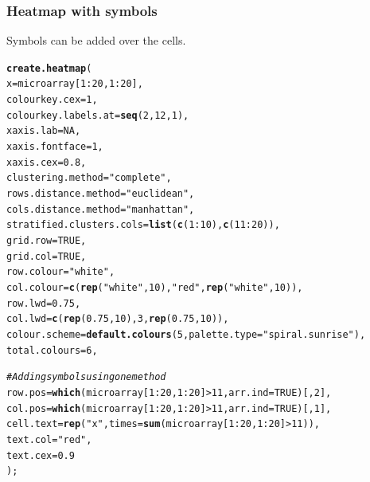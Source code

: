 \documentclass[letterpaper]{article}\usepackage[]{graphicx}\usepackage[]{color}
\makeatletter
\newcommand{\hlnum}[1]{\textcolor[rgb]{0.686,0.059,0.569}{#1}}%
\newcommand{\hlstr}[1]{\textcolor[rgb]{0.192,0.494,0.8}{#1}}%
\newcommand{\hlcom}[1]{\textcolor[rgb]{0.678,0.584,0.686}{\textit{#1}}}%
\newcommand{\hlopt}[1]{\textcolor[rgb]{0,0,0}{#1}}%
\newcommand{\hlstd}[1]{\textcolor[rgb]{0.345,0.345,0.345}{#1}}%
\newcommand{\hlkwc}[1]{\textcolor[rgb]{0.333,0.667,0.333}{#1}}%
\newcommand{\hlkwd}[1]{\textcolor[rgb]{0.737,0.353,0.396}{\textbf{#1}}}%
\newenvironment{kframe}{%
 \def\at@end@of@kframe{}%
 \ifinner\ifhmode%
  \def\at@end@of@kframe{\end{minipage}}%
  \begin{minipage}{\columnwidth}%
 \fi\fi%
 \def\FrameCommand##1{\hskip\@totalleftmargin \hskip-\fboxsep
 \colorbox{shadecolor}{##1}\hskip-\fboxsep
     \hskip-\linewidth \hskip-\@totalleftmargin \hskip\columnwidth}%
 \MakeFramed {\advance\hsize-\width
   \@totalleftmargin\z@ \linewidth\hsize
   \@setminipage}}%
 {\par\unskip\endMakeFramed%
 \at@end@of@kframe}
\newenvironment{knitrout}{}{} %
\makeatother
\begin{document}
\subsubsection{Heatmap with symbols}
Symbols can be added over the cells.

\begin{knitrout}
\color{fgcolor}\begin{kframe}
\begin{alltt}
\hlkwd{create.heatmap}\hlstd{(}
    \hlkwc{x} \hlstd{= microarray[}\hlnum{1}\hlopt{:}\hlnum{20}\hlstd{,} \hlnum{1}\hlopt{:}\hlnum{20}\hlstd{],}
    \hlkwc{colourkey.cex} \hlstd{=} \hlnum{1}\hlstd{,}
    \hlkwc{colourkey.labels.at} \hlstd{=} \hlkwd{seq}\hlstd{(}\hlnum{2}\hlstd{,} \hlnum{12}\hlstd{,} \hlnum{1}\hlstd{),}
    \hlkwc{xaxis.lab} \hlstd{=} \hlnum{NA}\hlstd{,}
    \hlkwc{xaxis.fontface} \hlstd{=} \hlnum{1}\hlstd{,}
    \hlkwc{xaxis.cex} \hlstd{=} \hlnum{0.8}\hlstd{,}
    \hlkwc{clustering.method} \hlstd{=} \hlstr{"complete"}\hlstd{,}
    \hlkwc{rows.distance.method} \hlstd{=} \hlstr{"euclidean"}\hlstd{,}
    \hlkwc{cols.distance.method} \hlstd{=} \hlstr{"manhattan"}\hlstd{,}
    \hlkwc{stratified.clusters.cols} \hlstd{=} \hlkwd{list}\hlstd{(}\hlkwd{c}\hlstd{(}\hlnum{1}\hlopt{:}\hlnum{10}\hlstd{),} \hlkwd{c}\hlstd{(}\hlnum{11}\hlopt{:}\hlnum{20}\hlstd{)),}
    \hlkwc{grid.row} \hlstd{=} \hlnum{TRUE}\hlstd{,}
    \hlkwc{grid.col} \hlstd{=} \hlnum{TRUE}\hlstd{,}
    \hlkwc{row.colour} \hlstd{=} \hlstr{"white"}\hlstd{,}
    \hlkwc{col.colour} \hlstd{=} \hlkwd{c}\hlstd{(}\hlkwd{rep}\hlstd{(}\hlstr{"white"}\hlstd{,} \hlnum{10}\hlstd{),} \hlstr{"red"}\hlstd{,} \hlkwd{rep}\hlstd{(}\hlstr{"white"}\hlstd{,}\hlnum{10}\hlstd{)),}
    \hlkwc{row.lwd} \hlstd{=} \hlnum{0.75}\hlstd{,}
    \hlkwc{col.lwd} \hlstd{=} \hlkwd{c}\hlstd{(}\hlkwd{rep}\hlstd{(}\hlnum{0.75}\hlstd{,} \hlnum{10}\hlstd{),} \hlnum{3}\hlstd{,} \hlkwd{rep}\hlstd{(}\hlnum{0.75}\hlstd{,}\hlnum{10}\hlstd{)),}
   \hlkwc{colour.scheme} \hlstd{=} \hlkwd{default.colours}\hlstd{(}\hlnum{5}\hlstd{,} \hlkwc{palette.type} \hlstd{=} \hlstr{"spiral.sunrise"}\hlstd{),}
   \hlkwc{total.colours} \hlstd{=} \hlnum{6}\hlstd{,}

   \hlcom{# Adding symbols using one method}
   \hlkwc{row.pos} \hlstd{=} \hlkwd{which}\hlstd{(microarray[}\hlnum{1}\hlopt{:}\hlnum{20}\hlstd{,} \hlnum{1}\hlopt{:}\hlnum{20}\hlstd{]} \hlopt{>} \hlnum{11}\hlstd{,} \hlkwc{arr.ind} \hlstd{=} \hlnum{TRUE}\hlstd{)[,}\hlnum{2}\hlstd{],}
   \hlkwc{col.pos} \hlstd{=} \hlkwd{which}\hlstd{(microarray[}\hlnum{1}\hlopt{:}\hlnum{20}\hlstd{,} \hlnum{1}\hlopt{:}\hlnum{20}\hlstd{]} \hlopt{>} \hlnum{11}\hlstd{,} \hlkwc{arr.ind} \hlstd{=} \hlnum{TRUE}\hlstd{)[,}\hlnum{1}\hlstd{],}
   \hlkwc{cell.text} \hlstd{=} \hlkwd{rep}\hlstd{(}\hlstr{"x"}\hlstd{,} \hlkwc{times} \hlstd{=} \hlkwd{sum}\hlstd{(microarray[}\hlnum{1}\hlopt{:}\hlnum{20}\hlstd{,} \hlnum{1}\hlopt{:}\hlnum{20}\hlstd{]} \hlopt{>} \hlnum{11}\hlstd{)),}
   \hlkwc{text.col} \hlstd{=} \hlstr{"red"}\hlstd{,}
   \hlkwc{text.cex} \hlstd{=} \hlnum{0.9}
   \hlstd{);}
\end{alltt}
\end{kframe}\begin{figure}[]



\end{figure}
\end{knitrout}
\end{document}
